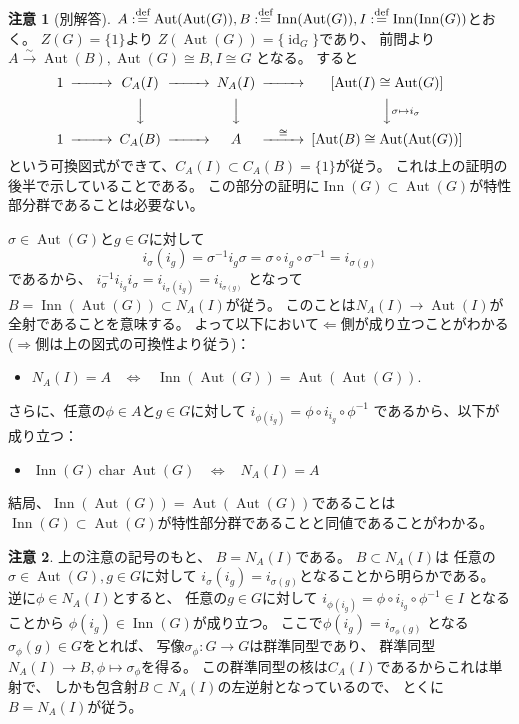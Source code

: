 \documentclass[uplatex]{jsreport}
\theoremstyle{definition}
\newtheorem*{rem*}{注意}
\DeclareMathOperator{\id}{\mathrm{id}}
\DeclareMathOperator{\INN}{\mathrm{Inn}}
\DeclareMathOperator{\Aut}{\mathrm{Aut}}
\newcommand{\dfn}{:\overset{\mbox{{\scriptsize def}}}{=}}
\begin{document}
\begin{rem*}[別解答]
  \(A \dfn \Aut(\Aut(G)), B\dfn \INN(\Aut(G)), I\dfn \INN(\INN(G))\)とおく。
  \(Z(G) = \{1\}\)より
  \(Z(\Aut(G)) = \{\id_G\}\)であり、
  前問より\(A\xrightarrow{\sim} \Aut(B), \Aut(G)\cong B, I\cong G\)
  となる。
  すると
  \[
  \begin{CD}
    1 @>>> C_A(I) @>>> N_A(I) @>>> \left[\Aut(I)\cong \Aut(G)\right] \\
    @. @VVV @VVV @VV{\sigma\mapsto i_{\sigma}}V \\
    1 @>>> C_A(B) @>>> A @>{\cong}>> \left[\Aut(B)\cong \Aut(\Aut(G))\right]
  \end{CD}
  \]
  という可換図式ができて、\(C_A(I)\subset C_A(B) = \{1\}\)が従う。
  これは上の証明の後半で示していることである。
  この部分の証明に\(\INN(G)\subset \Aut(G)\)が特性部分群であることは必要ない。

  \(\sigma\in \Aut(G)\)と\(g\in G\)に対して
  \[i_{\sigma}(i_g) = \sigma^{-1} i_g \sigma = \sigma \circ i_g \circ \sigma^{-1} = i_{\sigma(g)}\]
  であるから、
  \(i_{\sigma}^{-1}i_{i_g}i_{\sigma} = i_{i_{\sigma}(i_g)} = i_{i_{\sigma(g)}}\)
  となって\(B = \INN(\Aut(G)) \subset N_A(I)\)が従う。
  このことは\(N_A(I)\to \Aut(I)\)が全射であることを意味する。
  よって以下において\(\Leftarrow\)側が成り立つことがわかる
  (\(\Rightarrow\)側は上の図式の可換性より従う)：
  \begin{itemize}
    \item[ \ ]
    \(N_A(I) = A\) \ \(\iff\) \
    \(\INN(\Aut(G)) = \Aut(\Aut(G))\).
  \end{itemize}
  さらに、任意の\(\phi\in A\)と\(g\in G\)に対して
  \(i_{\phi(i_g)} = \phi\circ i_{i_g}\circ \phi^{-1}\)
  であるから、以下が成り立つ：
  \begin{itemize}
    \item[ \ ]
    \(\INN(G) \ \text{char} \ \Aut(G)\) \ \(\iff\) \ \(N_A(I) = A\)
  \end{itemize}
  結局、\(\INN(\Aut(G)) = \Aut(\Aut(G))\)であることは
  \(\INN(G)\subset \Aut(G)\)が特性部分群であることと同値であることがわかる。
\end{rem*}


\begin{rem*}
  上の注意の記号のもと、
  \(B = N_A(I)\)である。
  \(B \subset N_A(I)\)は
  任意の\(\sigma\in \Aut(G), g\in G\)に対して
  \(i_{\sigma}(i_g) = i_{\sigma(g)}\)となることから明らかである。
  逆に\(\phi\in N_A(I)\)とすると、
  任意の\(g\in G\)に対して
  \(i_{\phi(i_g)} = \phi\circ i_{i_g}\circ \phi^{-1} \in I\)
  となることから
  \(\phi(i_g)\in \INN(G)\)が成り立つ。
  ここで\(\phi(i_g) = i_{\sigma_{\phi}(g)}\)
  となる\(\sigma_{\phi}(g)\in G\)をとれば、
  写像\(\sigma_{\phi}: G\to G\)は群準同型であり、
  群準同型\(N_A(I) \to B, \phi\mapsto \sigma_{\phi}\)を得る。
  この群準同型の核は\(C_A(I)\)であるからこれは単射で、
  しかも包含射\(B\subset N_A(I)\)の左逆射となっているので、
  とくに\(B = N_A(I)\)が従う。
\end{rem*}
\end{document}
